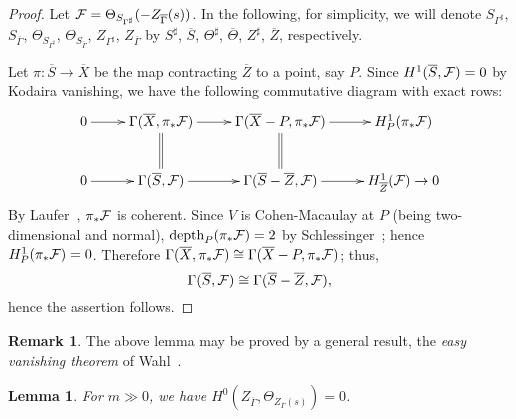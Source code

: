 \documentclass[a4paper, reqno, twoside]{amsart}
\newtheorem{lemma}[theorem]{Lemma}
\theoremstyle{definition}
\newtheorem{remark}[theorem]{Remark}
\numberwithin{equation}{section}
\begin{document}
\begin{proof}
Let ${\ensuremath \mathcal{F}}=\Theta_{S_{\Gamma^{\sharp}}}(-Z_{\overline{\Gamma}}(s))$.
In the following, for simplicity, we will denote
$S_{\Gamma^{\sharp}}$, $S_{\overline{\Gamma}}$,
$\Theta_{S_{\Gamma^{\sharp}}}$, $\Theta_{S_{\overline{\Gamma}}}$,
$Z_{\Gamma^{\sharp}}$, $Z_{\overline{\Gamma}}$ by $S^{\sharp}$,
$\overline{S}$, $\Theta^{\sharp}$, $\overline{\Theta}$, $Z^{\sharp}$,
$\overline{Z}$, respectively.

Let $\pi: \overline{S} \to \overline{X}$ be the map contracting $\overline{Z}$ to a point, say $P$. Since $H^1(\overline{S}, {\ensuremath \mathcal{F}})=0$ by Kodaira vanishing, we have the following commutative diagram with exact rows:
\begin{equation*}
\xymatrix{
0 \ar[r] & \Gamma(\overline{X}, \pi_{\ast}{{\ensuremath \mathcal{F}}}) \ar@{=}[d] \ar[r] & \Gamma(\overline{X}-P, \pi_{\ast}{{\ensuremath \mathcal{F}}}) \ar[r] \ar@{=}[d] & H^1_P(\pi_{\ast}{{\ensuremath \mathcal{F}}}) \\
0 \ar[r] & \Gamma(\overline{S}, {\ensuremath \mathcal{F}}) \ar[r] & \Gamma(\overline{S}-\overline{Z}, {\ensuremath \mathcal{F}}) \ar[r] & H^1_{\overline{Z}}({\ensuremath \mathcal{F}}) \to 0
}
\end{equation*}
By Laufer~\cite[Lemma~5.2]{Laufer-1971}, $\pi_{\ast}{{\ensuremath \mathcal{F}}}$ is coherent. Since $V$ is Cohen-Macaulay at $P$ (being two-dimensional and normal),  $\operatorname{depth}_P(\pi_{\ast}{{\ensuremath \mathcal{F}}})=2$ by Schlessinger~\cite[Lemma~1]{Schlessinger-1971}; hence $H^1_P(\pi_{\ast}{{\ensuremath \mathcal{F}}})=0$. Therefore $\Gamma(\overline{X}, \pi_{\ast}{{\ensuremath \mathcal{F}}}) \cong \Gamma(\overline{X}-P, \pi_{\ast}{{\ensuremath \mathcal{F}}})$; thus,
\begin{equation}\label{equation:S-vs-S-Z}
\Gamma(\overline{S}, {\ensuremath \mathcal{F}}) \cong \Gamma(\overline{S}-\overline{Z}, {\ensuremath \mathcal{F}}),
\end{equation}
hence the assertion follows.
\end{proof}

\begin{remark}
The above lemma may be proved by a general result, the
\textit{easy vanishing theorem} of Wahl~\cite{Wahl-2014}.
\end{remark}

\begin{lemma}\label{lemma:TZbar}
For $m \gg 0$, we have $H^0(Z_{\overline{\Gamma}}, \Theta_{Z_{\overline{\Gamma}}(s)})=0$.
\end{lemma}
\end{document}
